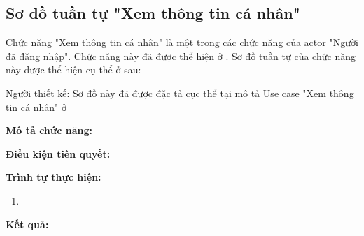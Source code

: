 \subsection{Sơ đồ tuần tự "Xem thông tin cá nhân"}
\setcounter{figure}{0}

Chức năng "Xem thông tin cá nhân" là một trong các chức năng của actor
"Người đã đăng nhập". Chức năng này đã được thể hiện ở .
Sơ đồ tuần tự của chức năng này được thể hiện cụ thể ở \myref{} sau:

Người thiết kế:
Sơ đồ này đã được đặc tả cục thể tại mô tả Use case "Xem thông tin cá nhân"
ở 

\noindent
\textbf{Mô tả chức năng:}

\noindent
\textbf{Điều kiện tiên quyết:}

\noindent
\textbf{Trình tự thực hiện:}

\noindent
\begin{enumerate}
  \item
\end{enumerate}

\noindent
\textbf{Kết quả:}

